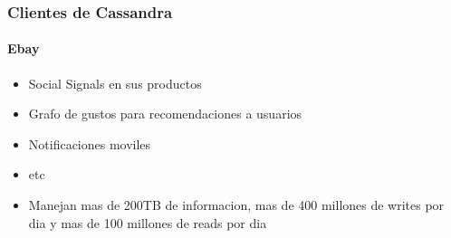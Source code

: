 \documentclass{beamer}
\begin{document}
\begin{frame}
  \frametitle{Clientes de Cassandra}
  \framesubtitle{Ebay}
  \begin{itemize}
    \setlength{\itemsep}{4pt}
    \item Social Signals en sus productos
    \pause
    \item Grafo de gustos para recomendaciones a usuarios
    \pause
    \item Notificaciones moviles
    \pause 
    \item etc
    \pause
    \item Manejan mas de 200TB de informacion, mas de 400 millones de writes por dia y mas de 100 millones de reads por dia
  \end{itemize}
\end{frame}
\end{document}
